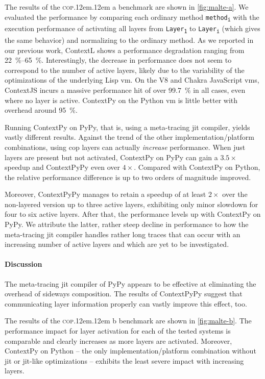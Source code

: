 \documentclass[preprint,english,10pt,nonatbib]{sigplanconf}
\DeclareRobustCommand*\copa{\textsc{cop}\kern .12em\oldstylenums{09}\kern .12em a\xspace}
\DeclareRobustCommand*\copb{\textsc{cop}\kern .12em\oldstylenums{09}\kern .12em b\xspace}
\begin{document}
The results of the \copa benchmark are shown in \autoref{fig:malte-a}. We
evaluated the performance by comparing each ordinary method
\texttt{method\textsubscript{i}} with the execution performance of activating
all layers from \texttt{Layer\textsubscript{1}} to
\texttt{Layer\textsubscript{i}} (which gives the same behavior) and normalizing
to the ordinary method. As we reported in our previous work, ContextL shows a
performance degradation ranging from \SIrange{22}{65}{\percent}. Interestingly,
the decrease in performance does not seem to correspond to the number of active
layers, likely due to the variability of the optimizations of the underlying
Lisp \ac{vm}. On the V8 and Chakra JavaScript \acp{vm}, ContextJS incurs a
massive performance hit of over \SI{99.7}{\percent} in all cases, even where no
layer is active. ContextPy on the Python \ac{vm} is little better with overhead
around \SI{95}{\percent}.

Running ContextPy on PyPy, that is, using a meta-tracing \ac{jit} compiler,
yields vastly different results. Against the trend of the other
implementation/platform combinations, using \ac{cop} layers can actually
\emph{increase} performance. When just layers are present but not activated,
ContextPy on PyPy can gain a \(3.5\times\) speedup and ContextPyPy even over
\(4\times\). Compared with ContextPy on Python, the relative performance
difference is up to two orders of magnitude improved.

Moreover, ContextPyPy manages to retain a speedup of at least \(2\times\)
over the non-layered version up to three active layers, exhibiting only minor
slowdown for four to six active layers. After that, the performance levels up
with ContextPy on PyPy. We attribute the latter, rather steep decline in
performance to how the meta-tracing \ac{jit} compiler handles rather long
traces that can occur with an increasing number of active layers and which are
yet to be investigated.

\paragraph{Discussion} The meta-tracing \ac{jit} compiler of PyPy appears to be
effective at eliminating the overhead of sideways composition. The results of
ContextPyPy suggest that communicating layer information properly can vastly
improve this effect, too.
%

\medskip\noindent %
The results of the \copb benchmark are shown in \autoref{fig:malte-b}. The
performance impact for layer activation for each of the tested systems is
comparable and clearly increases as more layers are activated. Moreover,
ContextPy on Python \--- the only implementation/platform combination without
\ac{jit} or \ac{jit}-like optimizations \--- exhibits the least severe impact
with increasing layers.
\end{document}

